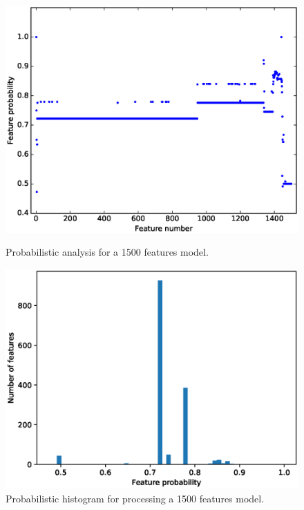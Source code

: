 \begin{figure}[h]
        \centering
        \begin{minipage}[b]{0.48\textwidth}
                \includegraphics[width=\textwidth]{plot_probs_probs.eps}
\caption{Probabilistic analysis for a 1500 features model.}\label{fig:plot:probs:probs}
        \end{minipage}
        \hfill
        \begin{minipage}[b]{0.48\textwidth}
                \includegraphics[width=\textwidth]{FeatureModel1500Features_histogram.eps}
        \caption{Probabilistic histogram for processing a 1500 features model.}\label{fig:plot:probs:probs:sorted}
        \end{minipage}
\end{figure}


